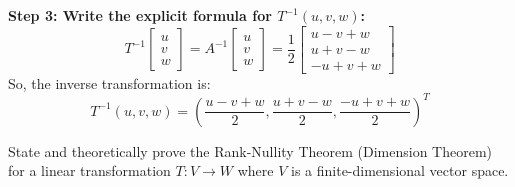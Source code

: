 \documentclass[11pt,a4paper]{article}
\begin{document}
\begin{solutionbox}
\textbf{Step 3: Write the explicit formula for $T^{-1}(u, v, w)$:}
\[ T^{-1} \begin{bmatrix} u \\ v \\ w \end{bmatrix} = A^{-1} \begin{bmatrix} u \\ v \\ w \end{bmatrix} = \frac{1}{2} \begin{bmatrix} u - v + w \\ u + v - w \\ -u + v + w \end{bmatrix} \]
So, the inverse transformation is:
\[ T^{-1}(u, v, w) = \left( \frac{u - v + w}{2}, \frac{u + v - w}{2}, \frac{-u + v + w}{2} \right)^T \]
\end{solutionbox}

\vspace{0.8cm}

\begin{questionbox}
State and theoretically prove the Rank-Nullity Theorem (Dimension Theorem) for a linear transformation $T: V \to W$ where $V$ is a finite-dimensional vector space.
\end{questionbox}
\end{document}
